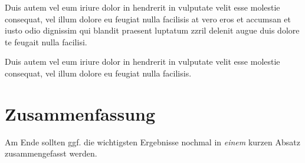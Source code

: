 Duis autem vel eum iriure dolor in hendrerit in vulputate velit esse molestie consequat, vel illum dolore eu feugiat nulla facilisis at vero eros et accumsan et iusto odio dignissim qui blandit praesent luptatum zzril delenit augue duis dolore te feugait nulla facilisi. 

Duis autem vel eum iriure dolor in hendrerit in vulputate velit esse molestie consequat, vel illum dolore eu feugiat nulla facilisis. 

\section{Zusammenfassung}
\label{ch:Analyse:sec:zusammenfassung}

Am Ende sollten ggf. die wichtigsten Ergebnisse nochmal in \emph{einem}
kurzen Absatz zusammengefasst werden.

